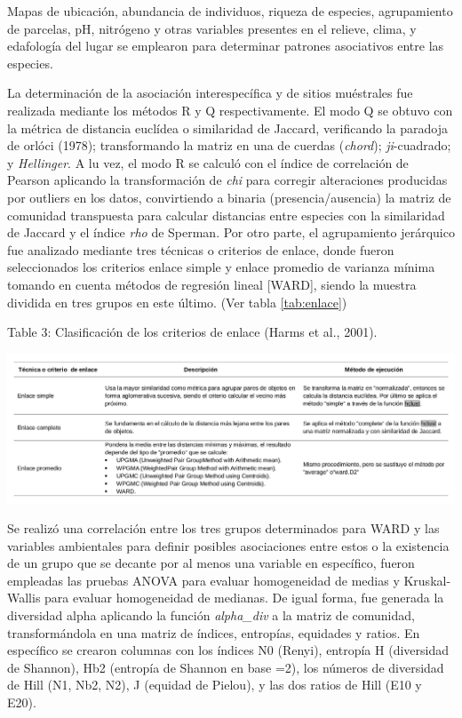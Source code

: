 \documentclass[11pt,]{article}
\begin{document}
Mapas de ubicación, abundancia de individuos, riqueza de especies,
agrupamiento de parcelas, pH, nitrógeno y otras variables presentes en
el relieve, clima, y edafología del lugar se emplearon para determinar
patrones asociativos entre las especies.

La determinación de la asociación interespecífica y de sitios muéstrales
fue realizada mediante los métodos R y Q respectivamente. El modo Q se
obtuvo con la métrica de distancia euclídea o similaridad de Jaccard,
verificando la paradoja de orlóci (1978); transformando la matriz en una
de cuerdas (\emph{chord}); \emph{ji}-cuadrado; y \emph{Hellinger}. A lu
vez, el modo R se calculó con el índice de correlación de Pearson
aplicando la transformación de \emph{chi} para corregir alteraciones
producidas por outliers en los datos, convirtiendo a binaria
(presencia/ausencia) la matriz de comunidad transpuesta para calcular
distancias entre especies con la similaridad de Jaccard y el índice
\emph{rho} de Sperman. Por otro parte, el agrupamiento jerárquico fue
analizado mediante tres técnicas o criterios de enlace, donde fueron
seleccionados los criterios enlace simple y enlace promedio de varianza
mínima tomando en cuenta métodos de regresión lineal {[}WARD{]}, siendo
la muestra dividida en tres grupos en este último. (Ver tabla
\ref{tab:enlace})

Table 3: Clasificación de los criterios de enlace (Harms et al.,
2001).\label{tab:enlace}

\includegraphics[width=1.00000\textwidth]{Analisis/Diversidad/Tabla_Criterios_Enlace.png}
\textbar{}

Se realizó una correlación entre los tres grupos determinados para WARD
y las variables ambientales para definir posibles asociaciones entre
estos o la existencia de un grupo que se decante por al menos una
variable en específico, fueron empleadas las pruebas ANOVA para evaluar
homogeneidad de medias y Kruskal-Wallis para evaluar homogeneidad de
medianas. De igual forma, fue generada la diversidad alpha aplicando la
función \emph{alpha\_div} a la matriz de comunidad, transformándola en
una matriz de índices, entropías, equidades y ratios. En específico se
crearon columnas con los índices N0 (Renyi), entropía H (diversidad de
Shannon), Hb2 (entropía de Shannon en base =2), los números de
diversidad de Hill (N1, Nb2, N2), J (equidad de Pielou), y las dos
ratios de Hill (E10 y E20).
\end{document}
